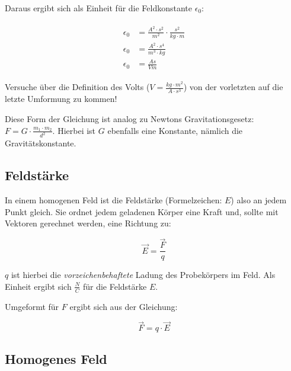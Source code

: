 Daraus ergibt sich als Einheit für die Feldkonstante $\epsilon_0$:

\begin{align}\label{eq:feldkonstante_einheiten}
\begin{split}
	\epsilon_0 &= \frac{A^{2} \cdot s^{2}}{m^{2}} \cdot \frac{s^{2}}{kg \cdot m} \\
	\epsilon_0 &= \frac{A^{2} \cdot s^{4}}{m^{3} \cdot kg} \\
	\epsilon_0 &= \frac{As}{Vm}
\end{split}
\end{align}

\begin{Aufgabe}
Versuche über die Definition des Volts ($V=\frac{kg \cdot m^2}{A \cdot s^3}$) von der vorletzten auf die letzte Umformung zu kommen!
\end{Aufgabe}

\begin{NiceToKnow}
Diese Form der Gleichung ist analog zu Newtons Gravitationsgesetz: $F = G \cdot \frac{m_1 \cdot m_2}{d^2}$. Hierbei ist $G$ ebenfalls eine Konstante, nämlich die Gravitätskonstante.
\end{NiceToKnow}


\subsection{Feldstärke}  \label{subsec:Feldstaerke}

In einem homogenen Feld ist die Feldstärke (Formelzeichen: $E$) also an jedem Punkt gleich. Sie ordnet jedem geladenen Körper eine Kraft und, sollte mit Vektoren gerechnet werden, eine Richtung zu:

\begin{equation} \label{eq:feldstaerke}
	\vec{E} = \frac{\vec{F}}{q}
\end{equation}

\noindent $q$ ist hierbei die \emph{vorzeichenbehaftete} Ladung des Probekörpers im Feld. Als Einheit ergibt sich $\frac{N}{C}$ für die Feldstärke $E$. 

Umgeformt für $F$ ergibt sich aus der Gleichung:

\begin{equation} \label{eq:feldstaerke_nach_F}
	\vec{F} = q \cdot \vec{E}
\end{equation}


\subsection{Homogenes Feld} \label{subsec:EFeldHomogen}


